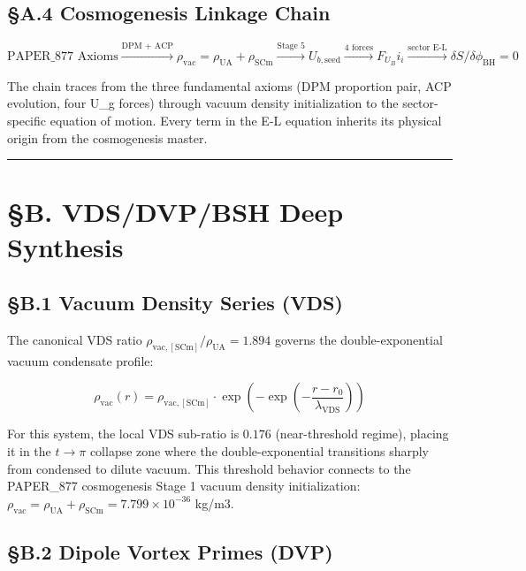 \documentclass[12pt,a4paper]{article}
\begin{document}
\subsection{\S{}A.4 Cosmogenesis Linkage Chain}

\begin{equation}
\text{PAPER\_877 Axioms} \xrightarrow{\text{DPM + ACP}} \rho_{\mathrm{vac}} = \rho_{\mathrm{UA}} + \rho_{\mathrm{SCm}} \xrightarrow{\text{Stage 5}} U_{b,\mathrm{seed}} \xrightarrow{\text{4 forces}} F_U_Bi_i \xrightarrow{\text{sector E-L}} \delta S/\delta \phi_{\mathrm{BH}} = 0
\end{equation}

The chain traces from the three fundamental axioms (DPM proportion pair, ACP evolution, four U\_g forces) through vacuum density initialization to the sector-specific equation of motion. Every term in the E-L equation inherits its physical origin from the cosmogenesis master.

\medskip\hrule\medskip

\section{\S{}B. VDS/DVP/BSH Deep Synthesis}

\subsection{\S{}B.1 Vacuum Density Series (VDS)}

The canonical VDS ratio $\rho_{\mathrm{vac,[SCm]}} / \rho_{\mathrm{UA}} = 1.894$ governs the double-exponential vacuum condensate profile:

\begin{equation}
\rho_{\mathrm{vac}}(r) = \rho_{\mathrm{vac,[SCm]}} \cdot \exp\!\left(-\exp\!\left(-\frac{r - r_0}{\lambda_{\mathrm{VDS}}}\right)\right)
\end{equation}

For this system, the local VDS sub-ratio is $0.176$ (near-threshold regime), placing it in the $t \to \pi$ collapse zone where the double-exponential transitions sharply from condensed to dilute vacuum. This threshold behavior connects to the PAPER\_877 cosmogenesis Stage 1 vacuum density initialization: $\rho_{\mathrm{vac}} = \rho_{\mathrm{UA}} + \rho_{\mathrm{SCm}} = 7.799 \times 10^{-36}$ kg/m3.

\subsection{\S{}B.2 Dipole Vortex Primes (DVP)}
\end{document}
